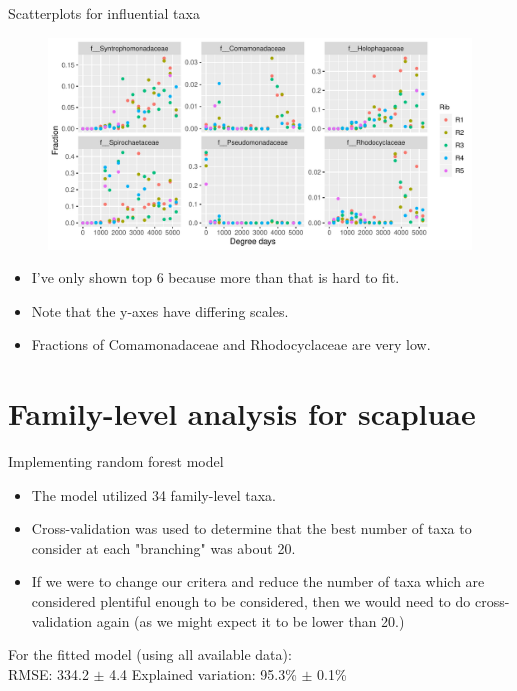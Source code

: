 \documentclass{beamer}
\begin{document}
\begin{frame}{Scatterplots for influential taxa}

  \begin{center}
    \begin{figure}
      \includegraphics[width=4.75in]{use_families/w_ribs/infl_rib_family_scatter}
    \end{figure}
  \end{center}
  \vspace{-0.25in}
  {\scriptsize
  \begin{itemize}
  \item I've only shown top 6 because more than that is hard to fit.
  \item Note that the y-axes have differing scales.
  \item Fractions of Comamonadaceae and Rhodocyclaceae are very low.
  \end{itemize}
  }

\end{frame}


\section[Scapulae, family-level]{Family-level analysis for scapluae}

\begin{frame}{Implementing random forest model}

\begin{itemize}
\item The model utilized 34 family-level taxa.
\item Cross-validation was used to determine that the best number of taxa to
consider at each "branching" was about 20.
\item If we were to change our critera and reduce the number of taxa which are
considered plentiful enough to be considered, then we would need to do
cross-validation again (as we might expect it to be lower than 20.)
\end{itemize}

\vspace{0.1in}

\noindent For the fitted model (using all available data):\\
\noindent RMSE: 334.2 $\pm$ 4.4 \hspace{0.05in}  Explained variation: 95.3\%
$\pm$ 0.1\%


\end{frame}
\end{document}
